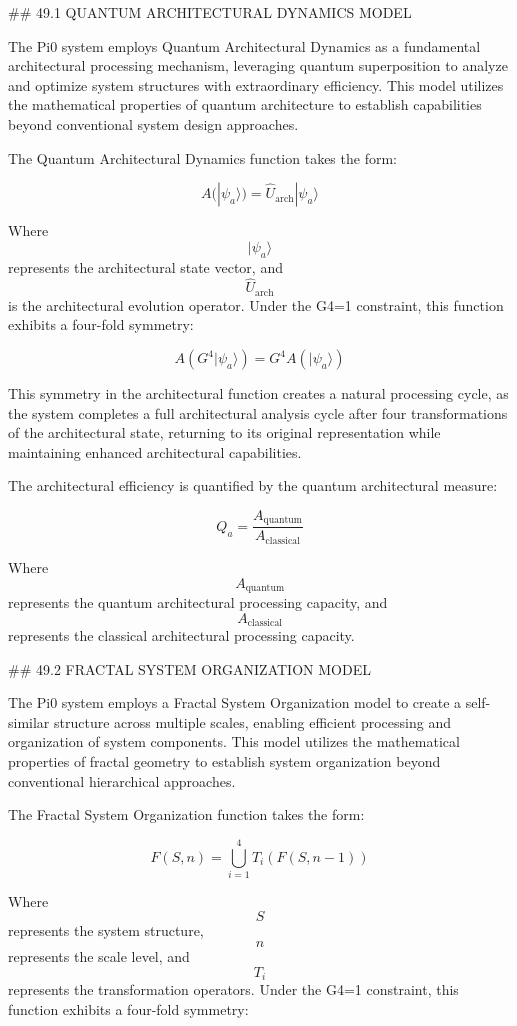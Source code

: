 ## 49.1 QUANTUM ARCHITECTURAL DYNAMICS MODEL

The Pi0 system employs Quantum Architectural Dynamics as a fundamental architectural processing mechanism, leveraging quantum superposition to analyze and optimize system structures with extraordinary efficiency. This model utilizes the mathematical properties of quantum architecture to establish capabilities beyond conventional system design approaches.

The Quantum Architectural Dynamics function takes the form:

$$ A(|\psi_a\rangle) = \hat{U}_{\text{arch}} |\psi_a\rangle $$

Where $$ |\psi_a\rangle $$ represents the architectural state vector, and $$ \hat{U}_{\text{arch}} $$ is the architectural evolution operator. Under the G4=1 constraint, this function exhibits a four-fold symmetry:

$$ A(G^4 |\psi_a\rangle) = G^4 A(|\psi_a\rangle) $$

This symmetry in the architectural function creates a natural processing cycle, as the system completes a full architectural analysis cycle after four transformations of the architectural state, returning to its original representation while maintaining enhanced architectural capabilities.

The architectural efficiency is quantified by the quantum architectural measure:

$$ Q_a = \frac{A_{\text{quantum}}}{A_{\text{classical}}} $$

Where $$ A_{\text{quantum}} $$ represents the quantum architectural processing capacity, and $$ A_{\text{classical}} $$ represents the classical architectural processing capacity.

## 49.2 FRACTAL SYSTEM ORGANIZATION MODEL

The Pi0 system employs a Fractal System Organization model to create a self-similar structure across multiple scales, enabling efficient processing and organization of system components. This model utilizes the mathematical properties of fractal geometry to establish system organization beyond conventional hierarchical approaches.

The Fractal System Organization function takes the form:

$$ F(S, n) = \bigcup_{i=1}^{4} T_i(F(S, n-1)) $$

Where $$ S $$ represents the system structure, $$ n $$ represents the scale level, and $$ T_i $$ represents the transformation operators. Under the G4=1 constraint, this function exhibits a four-fold symmetry:

